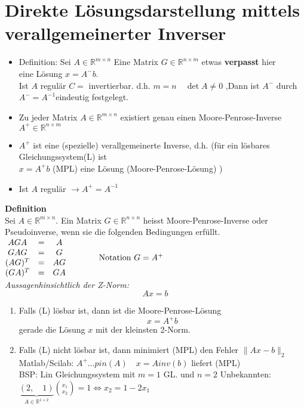 \documentclass[ngerman]{tudscrreprt}
\begin{document}
\section{Direkte Lösungsdarstellung mittels verallgemeinerter Inverser}
\begin{itemize}
\item Definition: Sei $A\in \mathbb{R}^{m\times n}$ Eine Matrix $G\in \mathbb{R}^{n\times m} $
etwas \textbf{verpasst} hier 
\\
eine Lösung $x = A^{-} b.$ \\
Ist $A$ regulär $C=$ invertierbar. d.h. $m=n \quad \det{A} \ne 0$ ,Dann ist $A^{-} $ durch $A^{-} = A^{-1} $eindeutig festgelegt.
\end{itemize}
\begin{itemize}
\item Zu jeder Matrix $A \in \mathbb{R}^{m \times n}$ existiert genau einen Moore-Penrose-Inverse $A^{+} \in \mathbb{R}^{n\times m}$
\item $A^{+} $ ist eine (spezielle) verallgemeinerte Inverse, d.h. (für ein lösbares Gleichungssystem(L) ist\\ $ x = A^{+}b $  (MPL) eine Lösung (Moore-Penrose-Lösung)  )
\item Ist $A $ regulär $\rightarrow A^{+} = A^{-1}$
\end{itemize}
\textbf{Definition}\\
Sei $A \in \mathbb{R}^{m \times n}.$ Ein Matrix $G\in \mathbb{R}^{n\times n}$ heisst Moore-Penrose-Inverse oder Pseudoinverse, wenn sie die folgenden Bedingungen erfüllt.\\
$
\begin{matrix}
AGA &=& A\\
GAG &=& G\\
(AG)^T &=& AG\\
(GA)^T &=&GA
\end{matrix} \qquad \qquad
\text{Notation } G = A^+ \\
$ \\
\textit{Aussagenhinsichtlich der Z-Norm:}\\
\begin{equation*}
Ax = b 
\tag{L}
\end{equation*}
\begin{enumerate}
\item Falls (L) lösbar ist, dann ist die Moore-Penrose-Lösung 
\begin{equation*}
x= A^+ b 
\tag{MPL}
\end{equation*}
gerade die Lösung $x$ mit der kleinsten 2-Norm.
\item Falls (L) nicht lösbar ist, dann minimiert (MPL) den Fehler $\|Ax-b\|_2$\\
Matlab/Scilab: $A^+ \dots pin(A)\quad x=A inv(b)$ liefert (MPL)\\
BSP: Lin Gleichungssystem mit $m=1$ GL. und $n=2$ Unbekannten:\\
$\underbrace{(2,\quad 1)}_{A\in \mathbb{R}^{1\times 2}}\binom{x_1}{x_2} = 1 \Leftrightarrow x_2 = 1-2 x_1$\\
\end{enumerate}
\end{document}
